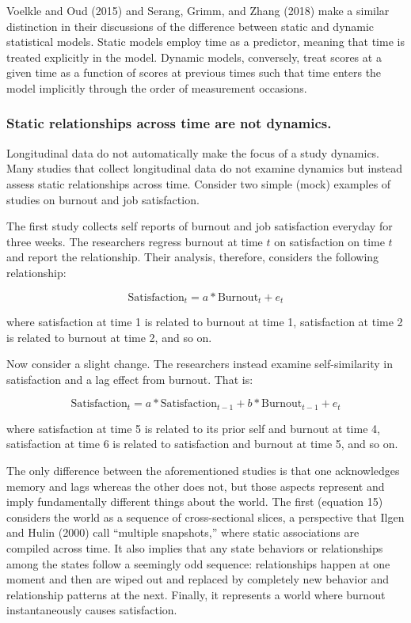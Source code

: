 \documentclass[english,,man]{apa6}
\theoremstyle{definition}
\theoremstyle{definition}
\theoremstyle{definition}
\theoremstyle{remark}
\begin{document}
Voelkle and Oud (2015) and Serang, Grimm, and Zhang (2018) make a
similar distinction in their discussions of the difference between
static and dynamic statistical models. Static models employ time as a
predictor, meaning that time is treated explicitly in the model. Dynamic
models, conversely, treat scores at a given time as a function of scores
at previous times such that time enters the model implicitly through the
order of measurement occasions.

\hypertarget{static-relationships-across-time-are-not-dynamics.}{%
\subsubsection{Static relationships across time are not
dynamics.}\label{static-relationships-across-time-are-not-dynamics.}}

Longitudinal data do not automatically make the focus of a study
dynamics. Many studies that collect longitudinal data do not examine
dynamics but instead assess static relationships across time. Consider
two simple (mock) examples of studies on burnout and job satisfaction.

The first study collects self reports of burnout and job satisfaction
everyday for three weeks. The researchers regress burnout at time \(t\)
on satisfaction on time \(t\) and report the relationship. Their
analysis, therefore, considers the following relationship:

\begin{equation}
\textrm{Satisfaction}_{t} = a * \textrm{Burnout}_{t} + e_{t}
\end{equation}

\noindent where satisfaction at time 1 is related to burnout at time 1,
satisfaction at time 2 is related to burnout at time 2, and so on.

Now consider a slight change. The researchers instead examine
self-similarity in satisfaction and a lag effect from burnout. That is:

\begin{equation}
\textrm{Satisfaction}_{t} = a * \textrm{Satisfaction}_{t - 1} + b * \textrm{Burnout}_{t - 1} + e_{t}
\end{equation}

\noindent where satisfaction at time 5 is related to its prior self and
burnout at time 4, satisfaction at time 6 is related to satisfaction and
burnout at time 5, and so on.

The only difference between the aforementioned studies is that one
acknowledges memory and lags whereas the other does not, but those
aspects represent and imply fundamentally different things about the
world. The first (equation 15) considers the world as a sequence of
cross-sectional slices, a perspective that Ilgen and Hulin (2000) call
\enquote{multiple snapshots,} where static associations are compiled
across time. It also implies that any state behaviors or relationships
among the states follow a seemingly odd sequence: relationships happen
at one moment and then are wiped out and replaced by completely new
behavior and relationship patterns at the next. Finally, it represents a
world where burnout instantaneously causes satisfaction.
\end{document}
